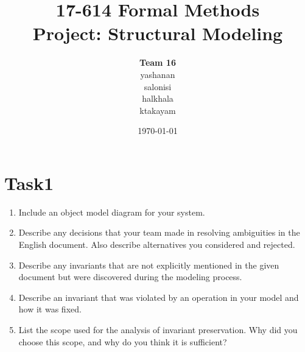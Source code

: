 \documentclass[titlepage]{article}
\begin{document}
\title{17-614 Formal Methods\\[1ex] Project: Structural Modeling}
\author{
{\Large\textbf{Team 16}}\\[3ex]
yashanan\\[1ex] salonisi\\[1ex] halkhala\\[1ex] ktakayam}
\date{\today}
\maketitle

\newpage

\section*{Task1}
\begin{enumerate}
    \item Include an object model diagram for your system.
    \item Describe any decisions that your team made in resolving ambiguities in the English document. Also describe alternatives you considered and rejected.
    \item Describe any invariants that are not explicitly mentioned in the given document but were discovered during the modeling process.
    \item Describe an invariant that was violated by an operation in your model and how it was fixed.
    \item List the scope used for the analysis of invariant preservation. Why did you choose this scope, and why do you
think it is sufficient?
\end{enumerate}
\end{document}

